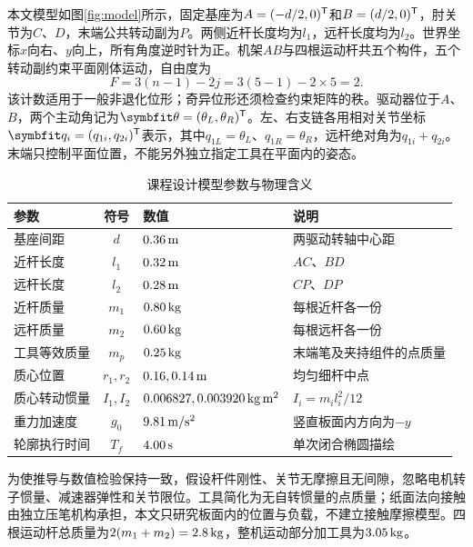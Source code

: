 本文模型如图\ref{fig:model}所示，固定基座为$A=(-d/2,0)^\mathsf T$和$B=(d/2,0)^\mathsf T$，肘关节为$C$、$D$，末端公共转动副为$P$。两侧近杆长度均为$l_1$，远杆长度均为$l_2$。世界坐标$x$向右、$y$向上，所有角度逆时针为正。机架$AB$与四根运动杆共五个构件，五个转动副约束平面刚体运动，自由度为
\begin{equation}
F=3(n-1)-2j=3(5-1)-2\times5=2.
\end{equation}
该计数适用于一般非退化位形；奇异位形还须检查约束矩阵的秩。驱动器位于$A$、$B$，两个主动角记为$\vect\theta=(\theta_L,\theta_R)^\T$。左、右支链各用相对关节坐标$\vect q_i=(q_{1i},q_{2i})^\T$表示，其中$q_{1L}=\theta_L$、$q_{1R}=\theta_R$，远杆绝对角为$q_{1i}+q_{2i}$。末端只控制平面位置，不能另外独立指定工具在平面内的姿态。


\begin{table}[htbp]
\centering\caption{课程设计模型参数与物理含义}\label{tab:parameters}
\small\begin{tabularx}{\linewidth}{@{}lclX@{}}
\toprule 参数 & 符号 & 数值 & 说明\\\midrule
基座间距 & $d$ & $0.36\,\mathrm{m}$ & 两驱动转轴中心距\\
近杆长度 & $l_1$ & $0.32\,\mathrm{m}$ & $AC$、$BD$\\
远杆长度 & $l_2$ & $0.28\,\mathrm{m}$ & $CP$、$DP$\\
近杆质量 & $m_1$ & $0.80\,\mathrm{kg}$ & 每根近杆各一份\\
远杆质量 & $m_2$ & $0.60\,\mathrm{kg}$ & 每根远杆各一份\\
工具等效质量 & $m_p$ & $0.25\,\mathrm{kg}$ & 末端笔及夹持组件的点质量\\
质心位置 & $r_1,r_2$ & $0.16,0.14\,\mathrm{m}$ & 均匀细杆中点\\
质心转动惯量 & $I_1,I_2$ & $0.006827,0.003920\,\mathrm{kg\,m^2}$ & $I_i=m_i l_i^2/12$\\
重力加速度 & $g_0$ & $9.81\,\mathrm{m/s^2}$ & 竖直板面内方向为$-y$\\
轮廓执行时间 & $T_f$ & $4.00\,\mathrm{s}$ & 单次闭合椭圆描绘\\\bottomrule
\end{tabularx}
\end{table}

为使推导与数值检验保持一致，假设杆件刚性、关节无摩擦且无间隙，忽略电机转子惯量、减速器弹性和关节限位。工具简化为无自转惯量的点质量；纸面法向接触由独立压笔机构承担，本文只研究板面内的位置与负载，不建立接触摩擦模型。四根运动杆总质量为$2(m_1+m_2)=2.8\,\mathrm{kg}$，整机运动部分加工具为$3.05\,\mathrm{kg}$。

